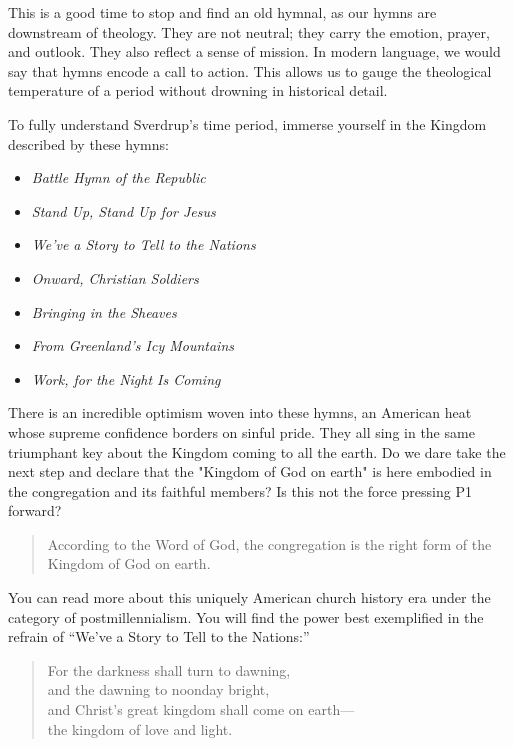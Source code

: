 This is a good time to stop and find an old hymnal, as our hymns are downstream of theology. They are not neutral; they carry the emotion, prayer, and outlook. They also reflect a sense of mission. In modern language, we would say that hymns encode a call to action. This allows us to gauge the theological temperature of a period without drowning in historical detail.     

To fully understand Sverdrup's time period, immerse yourself in the Kingdom described by these hymns:

\begin{itemize}
    \item \emph{Battle Hymn of the Republic}
	\item \emph{Stand Up, Stand Up for Jesus}
	\item \emph{We’ve a Story to Tell to the Nations}
	\item \emph{Onward, Christian Soldiers}
	\item \emph{Bringing in the Sheaves}
	\item \emph{From Greenland’s Icy Mountains}
    \item \emph{Work, for the Night Is Coming}
\end{itemize}

There is an incredible optimism woven into these hymns, an American heat whose supreme confidence borders on sinful pride. They all sing in the same triumphant key about the Kingdom coming to all the earth. Do we dare take the next step and declare that the "Kingdom of God on earth" is here embodied in the congregation and its faithful members? Is this not the force pressing P1 forward?


\begin{quote}
According to the Word of God, the congregation is the right form of the Kingdom of God on earth.
\end{quote}

You can read more about this uniquely American church history era under the category of postmillennialism. You will find the power best exemplified in the refrain of ``We’ve a Story to Tell to the Nations:''

\begin{quote}
For the darkness shall turn to dawning,\\
and the dawning to noonday bright,\\
and Christ's great kingdom shall come on earth—\\
the kingdom of love and light.
\end{quote}

